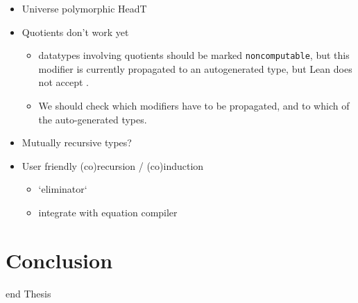\documentclass[titlepage]{report}
\newenvironment{todo}{\begin{shaded}\begin{trivlist}                         
    \item[\hskip \labelsep {\bfseries Todo:}]}{\end{trivlist}\end{shaded}}
\newenvironment{leanhidden}{\expandafter\comment}{\expandafter\endcomment}
\newcommand\inductive{\lean{inductive}}
\begin{document}
\begin{todo}
    


    \begin{itemize}
        \item Universe polymorphic HeadT
        
        \item Quotients don't work yet
              \begin{itemize}
                \item datatypes involving quotients should be marked \texttt{noncomputable}, but this modifier is currently propagated to an autogenerated \inductive type, but Lean does not accept .

                \item We should check which modifiers have to be propagated, and to which of the auto-generated types.
              \end{itemize}
        

        \item Mutually recursive types?
        
        \item User friendly (co)recursion / (co)induction
                \begin{itemize}
                    \item `eliminator`
                    \item integrate with equation compiler
                \end{itemize}
    \end{itemize}
\end{todo}









\chapter{Conclusion}
\label{ch:conclusion}















\begin{leanhidden}
    end Thesis
\end{leanhidden}





\end{document}
